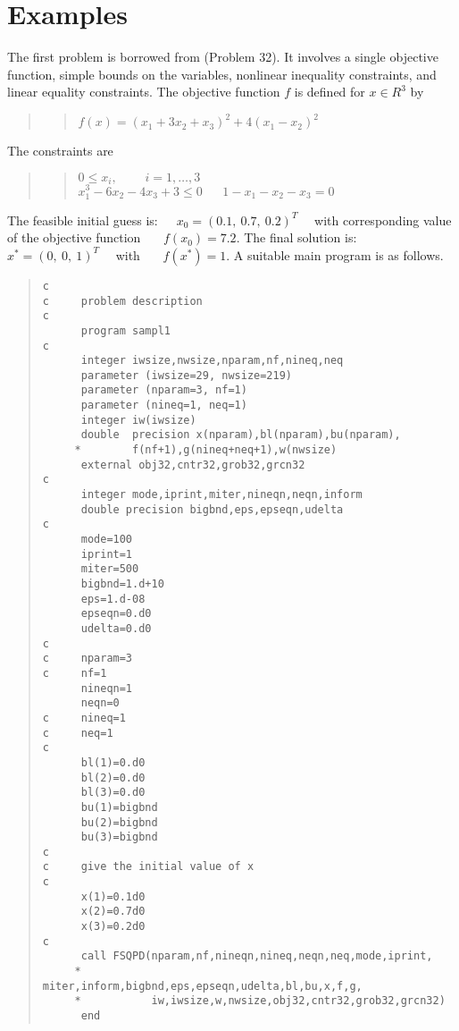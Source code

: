 \section{Examples}
\label{example}
The first problem is borrowed 
from\Lspace {}\Rcitemark \Rspace{} (Problem 32).
It involves a single objective function, simple bounds on the variables,
nonlinear inequality constraints,
and linear equality constraints.
The objective function $f$ is defined for $x\in R^3$ by
\begin{quote}
\begin{quote}
$f(x)=(x_1+3x_2+x_3)^2+4(x_1-x_2)^2$
\end{quote}
\end{quote}
The constraints are
\begin{quote}
\begin{quote}
   $0 \leq x_i ,~~~~~~~~~~i = 1,\ldots,3$ \\
   $x_1^3-6x_2-4x_3+3 \leq 0\;\;\;\;\;\
                    1-x_1-x_2-x_3 = 0$
\end{quote}
\end{quote}
The feasible initial guess is:~~~$x_0=(0.1,~0.7,~0.2)^T$ ~~with 
corresponding value
of the objective function~~~ $f(x_0)=7.2$. 
The final solution is:~~~$x^*=(0,~0,~1)^T$ ~~with ~~~$f(x^*)=1$.
A suitable main program is as follows.
\begin{quote}
\begin{verbatim}
c
c     problem description
c
      program sampl1
c
      integer iwsize,nwsize,nparam,nf,nineq,neq
      parameter (iwsize=29, nwsize=219)
      parameter (nparam=3, nf=1)
      parameter (nineq=1, neq=1)
      integer iw(iwsize)
      double  precision x(nparam),bl(nparam),bu(nparam),
     *        f(nf+1),g(nineq+neq+1),w(nwsize)
      external obj32,cntr32,grob32,grcn32
c
      integer mode,iprint,miter,nineqn,neqn,inform
      double precision bigbnd,eps,epseqn,udelta
c
      mode=100
      iprint=1
      miter=500
      bigbnd=1.d+10
      eps=1.d-08
      epseqn=0.d0
      udelta=0.d0
c
c     nparam=3
c     nf=1
      nineqn=1
      neqn=0
c     nineq=1
c     neq=1
c
      bl(1)=0.d0
      bl(2)=0.d0
      bl(3)=0.d0
      bu(1)=bigbnd
      bu(2)=bigbnd
      bu(3)=bigbnd
c
c     give the initial value of x
c
      x(1)=0.1d0
      x(2)=0.7d0
      x(3)=0.2d0
c
      call FSQPD(nparam,nf,nineqn,nineq,neqn,neq,mode,iprint,
     *           miter,inform,bigbnd,eps,epseqn,udelta,bl,bu,x,f,g,
     *           iw,iwsize,w,nwsize,obj32,cntr32,grob32,grcn32)
      end
\end{verbatim}
\end{quote}
